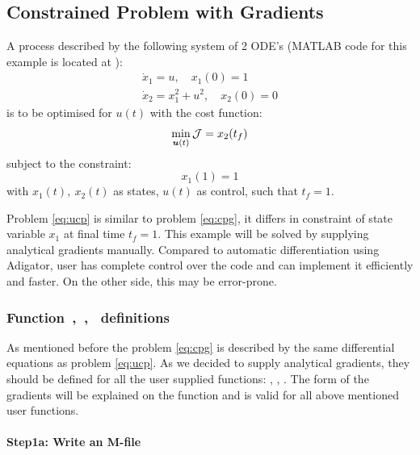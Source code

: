 \subsection{Constrained Problem with Gradients}
\label{sec:conprobgrad}

A process described by the following system of 2
ODE's \citep{raj01,luu91} (MATLAB code for this example is located
at ):   
\begin{gather}
\dot{x}_1 = u, \quad x_{1}(0) = 1\\
\dot{x}_2 = x^{2}_{1} + u^{2}, \quad x_{2}(0) = 0
\end{gather} is to be optimised for $u(t)$ with the cost function:
\begin{equation}
\min_{\ve{u}(t)} \mf{J} = x_{2}(t_{f}) \label{eq:cpg} 
\end{equation} subject to the constraint:
\begin{equation}
x_{1}(1) = 1
\end{equation} with $x_{1}(t),~x_{2}(t)$ as states, $u(t)$ as control,
such that $t_{f} = 1$. 

Problem \eqref{eq:ucp} is similar to problem \eqref{eq:cpg}, it 
differs in constraint of state variable $x_{1}$ at final time
$t_{f}=1$. This example will be solved by supplying analytical
gradients manually. Compared to automatic differentiation using
Adigator, user has complete control over the code and can implement it
efficiently and faster. On the other side, this may be error-prone. 

\subsubsection{Function~,~,~  definitions}
\label{sec:conprobgrad-fundef}

As mentioned before the problem \eqref{eq:cpg} is described by the
same differential equations as problem \eqref{eq:ucp}. As we decided
to supply analytical gradients, they should be defined for all the
user supplied functions: , ,
. The form of the gradients will be explained on the
function  and is valid for all above mentioned user
functions.  

\paragraph{Step1a: Write an M-file~}

{\small }

